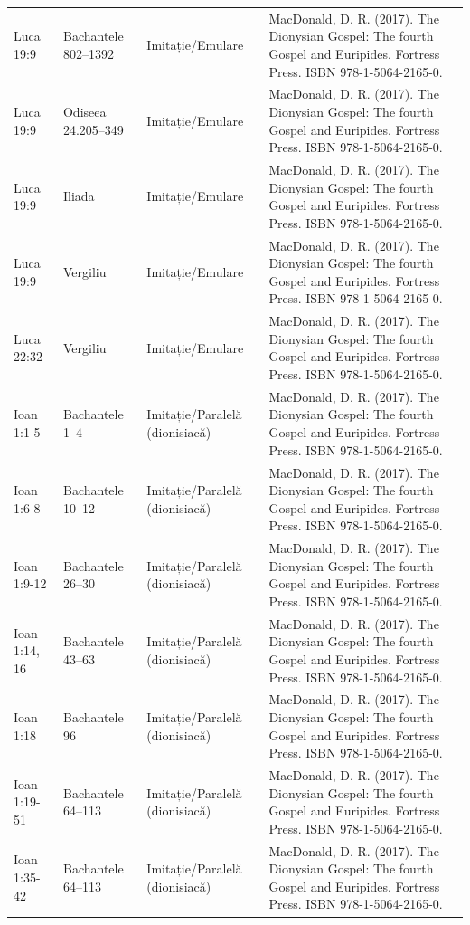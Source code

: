 \documentclass[12pt,a4paper,twoside,openany]{book}
\begin{document}
\begin{longtable}{L{1.4cm}L{1.7cm}L{3.1cm}L{8.4cm}}
Luca 19:9 & Bachantele 802–1392 & Imitație/Emulare & MacDonald, D. R. (2017). The Dionysian Gospel: The fourth Gospel and Euripides. Fortress Press. ISBN 978-1-5064-2165-0. \\
Luca 19:9 & Odiseea 24.205–349 & Imitație/Emulare & MacDonald, D. R. (2017). The Dionysian Gospel: The fourth Gospel and Euripides. Fortress Press. ISBN 978-1-5064-2165-0. \\
Luca 19:9 & Iliada & Imitație/Emulare & MacDonald, D. R. (2017). The Dionysian Gospel: The fourth Gospel and Euripides. Fortress Press. ISBN 978-1-5064-2165-0. \\
Luca 19:9 & Vergiliu & Imitație/Emulare & MacDonald, D. R. (2017). The Dionysian Gospel: The fourth Gospel and Euripides. Fortress Press. ISBN 978-1-5064-2165-0. \\
Luca 22:32 & Vergiliu & Imitație/Emulare & MacDonald, D. R. (2017). The Dionysian Gospel: The fourth Gospel and Euripides. Fortress Press. ISBN 978-1-5064-2165-0. \\
Ioan 1:1-5 & Bachantele 1–4 & Imitație/Paralelă (dionisiacă) & MacDonald, D. R. (2017). The Dionysian Gospel: The fourth Gospel and Euripides. Fortress Press. ISBN 978-1-5064-2165-0. \\
Ioan 1:6-8 & Bachantele 10–12 & Imitație/Paralelă (dionisiacă) & MacDonald, D. R. (2017). The Dionysian Gospel: The fourth Gospel and Euripides. Fortress Press. ISBN 978-1-5064-2165-0. \\
Ioan 1:9-12 & Bachantele 26–30 & Imitație/Paralelă (dionisiacă) & MacDonald, D. R. (2017). The Dionysian Gospel: The fourth Gospel and Euripides. Fortress Press. ISBN 978-1-5064-2165-0. \\
Ioan 1:14, 16 & Bachantele 43–63 & Imitație/Paralelă (dionisiacă) & MacDonald, D. R. (2017). The Dionysian Gospel: The fourth Gospel and Euripides. Fortress Press. ISBN 978-1-5064-2165-0. \\
Ioan 1:18 & Bachantele 96 & Imitație/Paralelă (dionisiacă) & MacDonald, D. R. (2017). The Dionysian Gospel: The fourth Gospel and Euripides. Fortress Press. ISBN 978-1-5064-2165-0. \\
Ioan 1:19-51 & Bachantele 64–113 & Imitație/Paralelă (dionisiacă) & MacDonald, D. R. (2017). The Dionysian Gospel: The fourth Gospel and Euripides. Fortress Press. ISBN 978-1-5064-2165-0. \\
Ioan 1:35-42 & Bachantele 64–113 & Imitație/Paralelă (dionisiacă) & MacDonald, D. R. (2017). The Dionysian Gospel: The fourth Gospel and Euripides. Fortress Press. ISBN 978-1-5064-2165-0. \\

\end{longtable}
\end{document}
